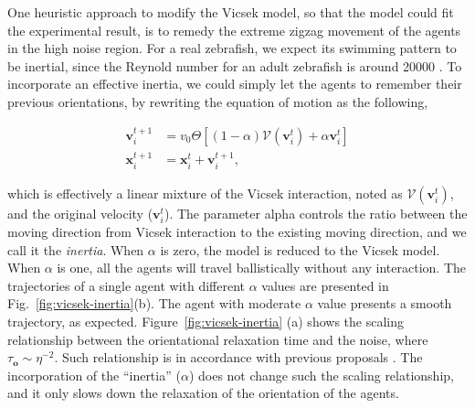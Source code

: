 \documentclass[11pt,twoside]{report}
\begin{document}
One heuristic approach to modify the Vicsek model, so that the model could fit the experimental result, is to remedy the extreme zigzag movement of the agents in the high noise region. For a real zebrafish, we expect its swimming pattern to be inertial, since the Reynold number for an adult zebrafish is around 20000 \cite{danos2012}. To incorporate an effective inertia, we could simply let the agents to remember their previous orientations, by rewriting the equation of motion as the following,


\begin{equation}
\begin{split}
	\mathbf{v}_{i}^{t+1}
	&= v_0 \Theta \left[
		(1 - \alpha) \mathcal{V}(\mathbf{v}_i^t) +
		\alpha \mathbf{v}_i^t
	\right]
    \\
	\mathbf{x}_i^{t+1}
	&= \mathbf{x}_i^{t} + \mathbf{v}_i^{t+1},
\end{split}
\label{eq:vicsek-inertia}
\end{equation}


\noindent which is effectively a linear mixture of the Vicsek interaction, noted as $\mathcal{V}(\mathbf{v}_i^t)$, and the original velocity ($\mathbf{v}_i^t$).
The parameter \gls{alpha} controls the ratio between the moving direction from Vicsek interaction to the existing moving direction, and we call it the \emph{inertia}.
When $\alpha$ is zero, the model is reduced to the Vicsek model.
When $\alpha$ is one, all the agents will travel ballistically without any interaction. The trajectories of a single agent with different $\alpha$ values are presented in Fig.~\ref{fig:vicsek-inertia}(b). The agent with moderate $\alpha$ value presents a smooth trajectory, as expected.
Figure~\ref{fig:vicsek-inertia} (a) shows the scaling relationship between the orientational relaxation time and the noise, where $\tau_\mathbf{o} \sim \eta^{-2}$. Such relationship is in accordance with previous proposals \cite{ginelli2016, puzzo2019}. The incorporation of the ``inertia'' ($\alpha$) does not change such the scaling relationship, and it only slows down the relaxation of the orientation of the agents.
\end{document}
